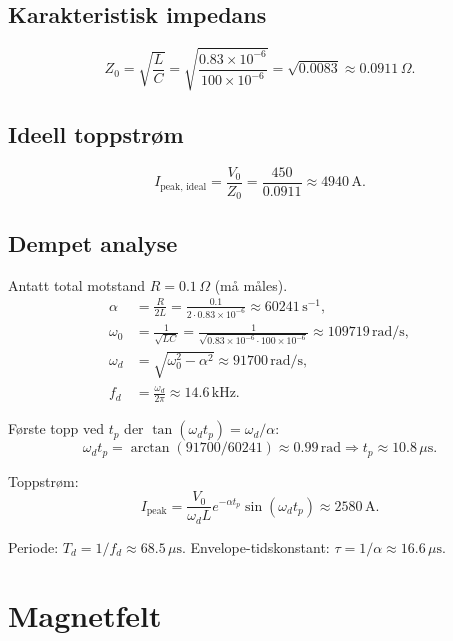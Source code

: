 \documentclass{article}
\begin{document}
\subsection{Karakteristisk impedans}
\begin{equation}
Z_0 = \sqrt{\frac{L}{C}} = \sqrt{\frac{0.83 \times 10^{-6}}{100 \times 10^{-6}}} = \sqrt{0.0083} \approx 0.0911\,\Omega.
\end{equation}

\subsection{Ideell toppstrøm}
\begin{equation}
I_{\text{peak, ideal}} = \frac{V_0}{Z_0} = \frac{450}{0.0911} \approx 4940\,\text{A}.
\end{equation}

\subsection{Dempet analyse}
Antatt total motstand $R = 0.1\,\Omega$ (må måles).
\begin{align}
\alpha &= \frac{R}{2L} = \frac{0.1}{2 \cdot 0.83 \times 10^{-6}} \approx 60241\,\text{s}^{-1}, \\
\omega_0 &= \frac{1}{\sqrt{LC}} = \frac{1}{\sqrt{0.83 \times 10^{-6} \cdot 100 \times 10^{-6}}} \approx 109719\,\text{rad/s}, \\
\omega_d &= \sqrt{\omega_0^2 - \alpha^2} \approx 91700\,\text{rad/s}, \\
f_d &= \frac{\omega_d}{2\pi} \approx 14.6\,\text{kHz}.
\end{align}

Første topp ved $t_p$ der $\tan(\omega_d t_p) = \omega_d/\alpha$:
\begin{equation}
\omega_d t_p = \arctan(91700/60241) \approx 0.99\,\text{rad}
\Rightarrow
t_p \approx 10.8\,\mu\text{s}.
\end{equation}

Toppstrøm:
\begin{equation}
I_{\text{peak}} =
\frac{V_0}{\omega_d L}
e^{-\alpha t_p}
\sin(\omega_d t_p)
\approx 2580\,\text{A}.
\end{equation}

Periode: $T_d = 1/f_d \approx 68.5\,\mu\text{s}$.
Envelope-tidskonstant: $\tau = 1/\alpha \approx 16.6\,\mu\text{s}$.

\section{Magnetfelt}
\end{document}
